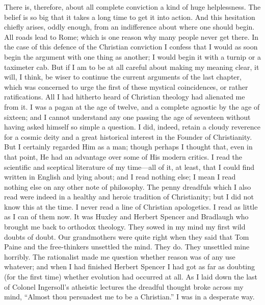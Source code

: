 \documentclass{book}
\begin{document}
There is, therefore, about all complete conviction a kind of huge helplessness. The belief is so big that it takes a long time to get it into action. And this hesitation chiefly arises, oddly enough, from an indifference about where one should begin. All roads lead to Rome; which is one reason why many people never get there. In the case of this defence of the Christian conviction I confess that I would as soon begin the argument with one thing as another; I would begin it with a turnip or a taximeter cab. But if I am to be at all careful about making my meaning clear, it will, I think, be wiser to continue the current arguments of the last chapter, which was concerned to urge the first of these mystical coincidences, or rather ratifications. All I had hitherto heard of Christian theology had alienated me from it. I was a pagan at the age of twelve, and a complete agnostic by the age of sixteen; and I cannot understand any one passing the age of seventeen without having asked himself so simple a question. I did, indeed, retain a cloudy reverence for a cosmic deity and a great historical interest in the Founder of Christianity. But I certainly regarded Him as a man; though perhaps I thought that, even in that point, He had an advantage over some of His modern critics. I read the scientific and sceptical literature of my time—all of it, at least, that I could find written in English and lying about; and I read nothing else; I mean I read nothing else on any other note of philosophy. The penny dreadfuls which I also read were indeed in a healthy and heroic tradition of Christianity; but I did not know this at the time. I never read a line of Christian apologetics. I read as little as I can of them now. It was Huxley and Herbert Spencer and Bradlaugh who brought me back to orthodox theology. They sowed in my mind my first wild doubts of doubt. Our grandmothers were quite right when they said that Tom Paine and the free-thinkers unsettled the mind. They do. They unsettled mine horribly. The rationalist made me question whether reason was of any use whatever; and when I had finished Herbert Spencer I had got as far as doubting (for the first time) whether evolution had occurred at all. As I laid down the last of Colonel Ingersoll’s atheistic lectures the dreadful thought broke across my mind, “Almost thou persuadest me to be a Christian.” I was in a desperate way.
\end{document}
